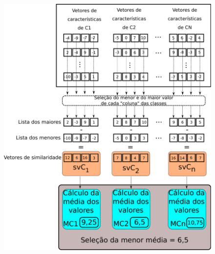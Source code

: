 \documentclass[aspectratio=169]{beamer}
\begin{document}
\begin{frame}
{\begin{figure}
				\includegraphics[height=0.8\textheight]{../monografia/images/calculoAlpha}
				\label{fig:calculoalpha}
			\end{figure}
		}
\end{frame}
\end{document}
